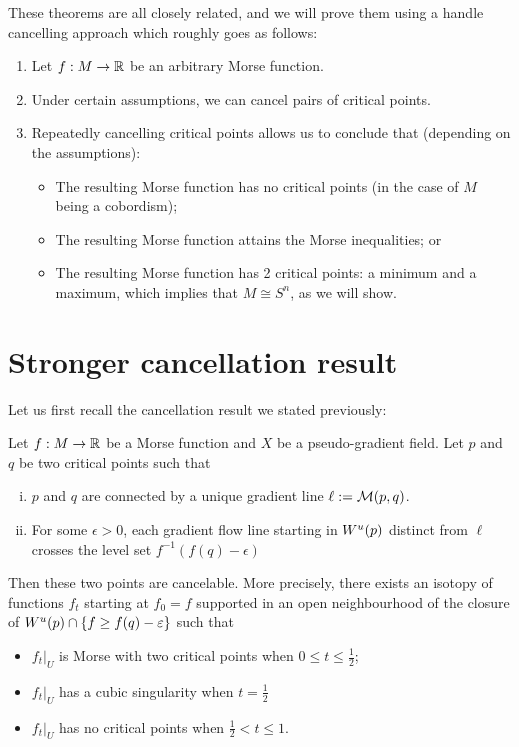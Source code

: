 These theorems are all closely related, and we will prove them using a handle cancelling approach which roughly goes as follows:
\begin{enumerate}[(1)]
    \item Let $f: M \to  \mathbb{R}$ be an arbitrary Morse function.
    \item Under certain assumptions, we can cancel pairs of critical points.
    \item Repeatedly cancelling critical points allows us to conclude that (depending on the assumptions):
        \begin{itemize}
            \item The resulting Morse function has no critical points (in the case of $M$ being a cobordism);
            \item The resulting Morse function attains the Morse inequalities; or
            \item The resulting Morse function has 2 critical points: a minimum and a maximum, which implies that $M \cong S^{n}$, as we will show.
        \end{itemize}
\end{enumerate}




\section{Stronger cancellation result}
Let us first recall the cancellation result we stated previously:

\begin{theorem}
    Let $f: M \to  \mathbb{R}$ be a Morse function and $X$ be a pseudo-gradient field.
    Let $p$ and $q$ be two critical points such that
    \begin{enumerate}[(i)]
        \item $p$ and $q$ are connected by a unique gradient line  $\ell := \mathcal M(p, q)$.
        \item For some $\epsilon>0$, each gradient flow line starting in $W^u(p)$ distinct from $ \ell$ crosses the level set $f^{-1}(f(q) - \epsilon)$
    \end{enumerate}
    Then these two points are cancelable.
More precisely, there exists an isotopy of functions $f_t$ starting at $f_0=f$ supported in an open neighbourhood of the closure of  $W^u(p) \cap  \{f \ge  f(q) - \varepsilon\} $ such that
\begin{itemize}
    \item $f_t|_U$ is Morse with two critical points when  $0 \le t\le \frac{1}{2}$;
    \item $f_t|_U$ has a cubic singularity when $t=\frac{1}{2}$
    \item $f_t|_U$ has no critical points when $\frac{1}{2}<t\le 1$.
\end{itemize}
\end{theorem}

